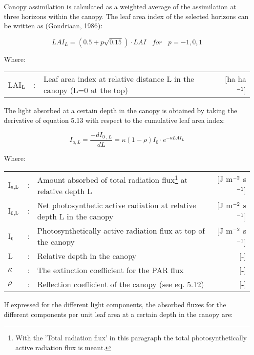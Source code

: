 Canopy assimilation is calculated as a weighted average of the assimilation at three
horizons within the canopy. The leaf area index of the selected horizons can be written as
(Goudriaan, 1986):

\begin{equation}
LAI_{L} = (0.5 + p \sqrt{0.15}) \cdot LAI~~~~for~~~~p = -1,0,1
\end{equation}

 
Where:\\[5pt]
\begin{tabularx}{\textwidth}{llXr}
LAI$_{{\rm L}}$ &:& Leaf area index at relative distance L in the canopy 
    (L=0 at the top)    &    [ha ha$^{{\rm -1}}$]\\
\end{tabularx}

The light absorbed at a certain depth in the canopy is obtained by taking the derivative of
equation 5.13 with respect to the cumulative leaf area index:

\begin{equation}
I_{a,L} = {\frac{-dI _{0\, ,\, L} }{dL}} = \kappa (1 -  \rho) I_{0} \cdot e^{- \kappa LAI_{L}}
\end{equation}

Where:\\[5pt]
\begin{tabularx}{\textwidth}{llXr}
I$_{{\rm a,L}}$ &:& Amount absorbed of total radia\-tion flux\footnote{With the 'Total radiation flux' in this paragraph the total photosynthetically active radiation flux is meant.} at relative depth L    &    [J m$^{{\rm -2}}$ s$^{{\rm -1}}$]\\
I$_{{\rm 0,L}}$ &:& Net photosynthetic active radiation at relative depth L in the canopy    &    [J m$^{{\rm -2}}$ s$^{{\rm -1}}$]\\
I$_{{\rm 0}}$ &:& Photosynthetically active radia\-tion flux at top of the canopy   &     [J m$^{{\rm -2}}$ s$^{{\rm -1}}$]\\
L &:& Relative depth in the canopy   &     [-]\\
$\kappa$ &:& The extinction coefficient for the PAR flux    &     [-]\\
$\rho$ &:& Reflection coefficient of the canopy (see eq. 5.12)   &     [-]\\
\end{tabularx}

If expressed for the different light components, the absorbed fluxes for the different
components per unit leaf area at a certain depth in the canopy are:

